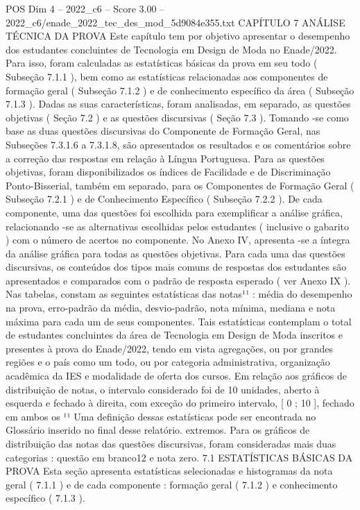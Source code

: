 \begin{textsample}{POS Dim 4 – 2022\_c6 – Score 3.00 – 2022\_c6/enade\_2022\_tec\_des\_mod\_5d9084e355.txt}  \label{ex:f4_pos_086}
CAPÍTULO 7 ANÁLISE TÉCNICA DA PROVA Este capítulo tem por objetivo apresentar o desempenho dos estudantes concluintes de Tecnologia em Design de Moda no Enade/2022.
Para isso, foram calculadas as estatísticas básicas da prova em seu todo ( Subseção 7.1.1 ), bem como as estatísticas relacionadas aos componentes de formação geral ( Subseção 7.1.2 ) e de conhecimento específico da área ( Subseção 7.1.3 ).
Dadas as suas características, foram analisadas, em separado, as questões objetivas ( Seção 7.2 ) e as questões discursivas ( Seção 7.3 ).
Tomando -se como base as duas questões discursivas do Componente de Formação Geral, nas Subseções 7.3.1.6 a 7.3.1.8, são apresentados os resultados e os comentários sobre a correção das respostas em relação à Língua Portuguesa.
Para as questões objetivas, foram disponibilizados os índices de Facilidade e de Discriminação Ponto-Bisserial, também em separado, para os Componentes de Formação Geral ( Subseção 7.2.1 ) e de Conhecimento Específico ( Subseção 7.2.2 ).
De cada componente, uma das questões foi escolhida para exemplificar a análise gráfica, relacionando -se as alternativas escolhidas pelos estudantes ( inclusive o gabarito ) com o número de acertos no componente.
No Anexo IV, apresenta -se a íntegra da análise gráfica para todas as questões objetivas.
Para cada uma das questões discursivas, os conteúdos dos tipos mais comuns de respostas dos estudantes são apresentados e comparados com o padrão de resposta esperado ( ver Anexo IX ).
Nas tabelas, constam as seguintes estatísticas das notas¹¹ : média do desempenho na prova, erro-padrão da média, desvio-padrão, nota mínima, mediana e nota máxima para cada um de seus componentes.
Tais estatísticas contemplam o total de estudantes concluintes da área de Tecnologia em Design de Moda inscritos e presentes à prova do Enade/2022, tendo em vista agregações, ou por grandes regiões e o país como um todo, ou por categoria administrativa, organização acadêmica da IES e modalidade de oferta dos cursos.
Em relação aos gráficos de distribuição de notas, o intervalo considerado foi de 10 unidades, aberto à esquerda e fechado à direita, com exceção do primeiro intervalo, [ 0 ; 10 ], fechado em ambos os ¹¹ Uma definição dessas estatísticas pode ser encontrada no Glossário inserido no final desse relatório. extremos.
Para os gráficos de distribuição das notas das questões discursivas, foram consideradas mais duas categorias : questão em branco12 e nota zero. 7.1 ESTATÍSTICAS BÁSICAS DA PROVA Esta seção apresenta estatísticas selecionadas e histogramas da nota geral ( 7.1.1 ) e de cada componente : formação geral ( 7.1.2 ) e conhecimento específico ( 7.1.3 ).

\end{textsample}
